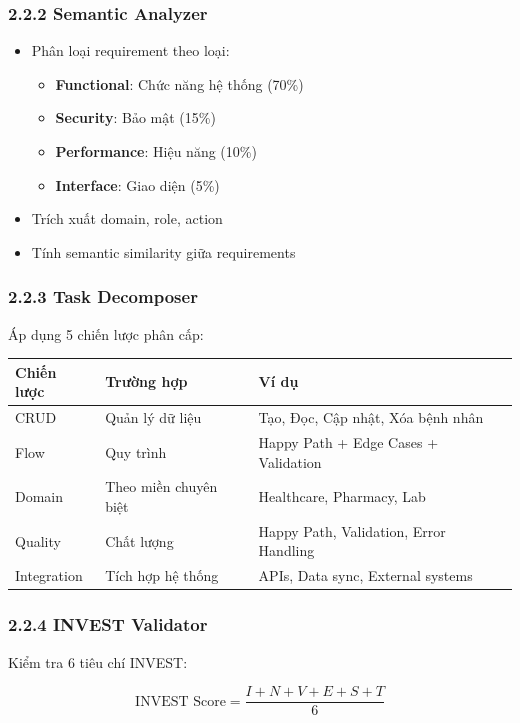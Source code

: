 \documentclass[12pt,a4paper]{article}
\begin{document}
\subsubsection{2.2.2 Semantic Analyzer}
\begin{itemize}
    \item Phân loại requirement theo loại:
    \begin{itemize}
        \item \textbf{Functional}: Chức năng hệ thống (70\%)
        \item \textbf{Security}: Bảo mật (15\%)
        \item \textbf{Performance}: Hiệu năng (10\%)
        \item \textbf{Interface}: Giao diện (5\%)
    \end{itemize}
    \item Trích xuất domain, role, action
    \item Tính semantic similarity giữa requirements
\end{itemize}

\subsubsection{2.2.3 Task Decomposer}
Áp dụng 5 chiến lược phân cấp:

\begin{table}[h]
\centering
\begin{tabular}{|l|l|p{6cm}|}
\hline
\textbf{Chiến lược} & \textbf{Trường hợp} & \textbf{Ví dụ} \\
\hline
CRUD & Quản lý dữ liệu & Tạo, Đọc, Cập nhật, Xóa bệnh nhân \\
\hline
Flow & Quy trình & Happy Path + Edge Cases + Validation \\
\hline
Domain & Theo miền chuyên biệt & Healthcare, Pharmacy, Lab \\
\hline
Quality & Chất lượng & Happy Path, Validation, Error Handling \\
\hline
Integration & Tích hợp hệ thống & APIs, Data sync, External systems \\
\hline
\end{tabular}
\end{table}

\subsubsection{2.2.4 INVEST Validator}
Kiểm tra 6 tiêu chí INVEST:

$$\text{INVEST Score} = \frac{I + N + V + E + S + T}{6}$$
\end{document}
